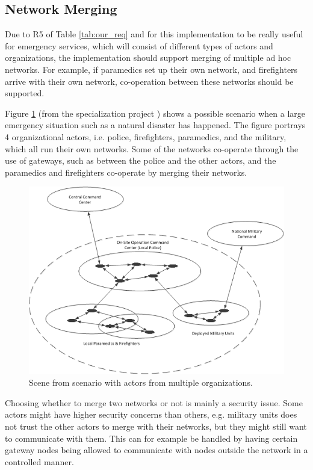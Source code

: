 \subsection{Network Merging}
Due to R5 of Table \ref{tab:our_req} and for this implementation to be really
useful for emergency services, which will consist of different types of actors
and organizations, the implementation should support merging of multiple ad hoc
networks. For example, if paramedics set up their own network, and firefighters
arrive with their own network, co-operation between these networks should be
supported.

Figure \ref{fig:scenario_networks} (from the specialization
project \cite{bowitz_graarud}) shows a possible scenario when a large emergency
situation such as a natural disaster has happened. The figure portrays 4
organizational actors, i.e. police, firefighters, paramedics, and the military,
which all run their own networks. Some of the networks co-operate through the
use of gateways, such as between the police and the other actors, and the
paramedics and firefighters co-operate by merging their networks.

\begin{figure}[h]
	\centering
  	\includegraphics[width=\textwidth]{images/scenario.png}
  	\caption{Scene from scenario with actors from multiple organizations.}
	\label{fig:scenario_networks}
\end{figure}

Choosing whether to merge two networks or not is mainly a security issue. Some
actors might have higher security concerns than others, e.g. military units does
not trust the other actors to merge with their networks, but they might still want
to communicate with them. This can for example be handled by having certain
gateway nodes being allowed to communicate with nodes outside the network in a
controlled manner.


